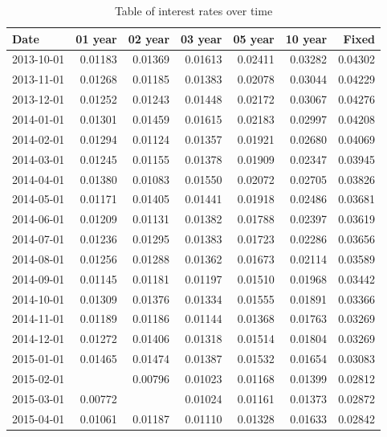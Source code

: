\documentclass[
]{book}
\begin{document}
\begin{table}

\caption{\label{tab:unnamed-chunk-5}Table of interest rates over time}
\centering
\begin{tabular}[t]{l|r|r|r|r|r|r}
\hline
Date & 01 year & 02 year & 03 year & 05 year & 10 year & Fixed\\
\hline
2013-10-01 & 0.01183 & 0.01369 & 0.01613 & 0.02411 & 0.03282 & 0.04302\\
\hline
2013-11-01 & 0.01268 & 0.01185 & 0.01383 & 0.02078 & 0.03044 & 0.04229\\
\hline
2013-12-01 & 0.01252 & 0.01243 & 0.01448 & 0.02172 & 0.03067 & 0.04276\\
\hline
2014-01-01 & 0.01301 & 0.01459 & 0.01615 & 0.02183 & 0.02997 & 0.04208\\
\hline
2014-02-01 & 0.01294 & 0.01124 & 0.01357 & 0.01921 & 0.02680 & 0.04069\\
\hline
2014-03-01 & 0.01245 & 0.01155 & 0.01378 & 0.01909 & 0.02347 & 0.03945\\
\hline
2014-04-01 & 0.01380 & 0.01083 & 0.01550 & 0.02072 & 0.02705 & 0.03826\\
\hline
2014-05-01 & 0.01171 & 0.01405 & 0.01441 & 0.01918 & 0.02486 & 0.03681\\
\hline
2014-06-01 & 0.01209 & 0.01131 & 0.01382 & 0.01788 & 0.02397 & 0.03619\\
\hline
2014-07-01 & 0.01236 & 0.01295 & 0.01383 & 0.01723 & 0.02286 & 0.03656\\
\hline
2014-08-01 & 0.01256 & 0.01288 & 0.01362 & 0.01673 & 0.02114 & 0.03589\\
\hline
2014-09-01 & 0.01145 & 0.01181 & 0.01197 & 0.01510 & 0.01968 & 0.03442\\
\hline
2014-10-01 & 0.01309 & 0.01376 & 0.01334 & 0.01555 & 0.01891 & 0.03366\\
\hline
2014-11-01 & 0.01189 & 0.01186 & 0.01144 & 0.01368 & 0.01763 & 0.03269\\
\hline
2014-12-01 & 0.01272 & 0.01406 & 0.01318 & 0.01514 & 0.01804 & 0.03269\\
\hline
2015-01-01 & 0.01465 & 0.01474 & 0.01387 & 0.01532 & 0.01654 & 0.03083\\
\hline
2015-02-01 &  & 0.00796 & 0.01023 & 0.01168 & 0.01399 & 0.02812\\
\hline
2015-03-01 & 0.00772 &  & 0.01024 & 0.01161 & 0.01373 & 0.02872\\
\hline
2015-04-01 & 0.01061 & 0.01187 & 0.01110 & 0.01328 & 0.01633 & 0.02842\\

\end{tabular}
\end{table}
\end{document}
